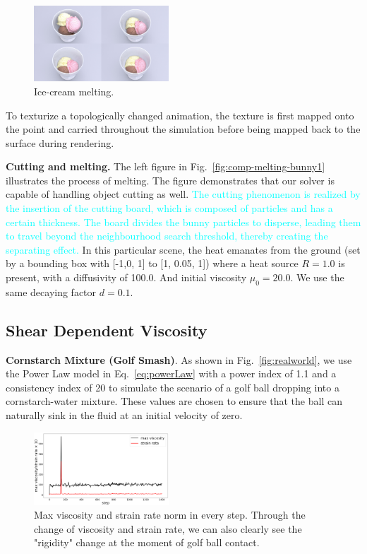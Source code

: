 \documentclass[10pt,journal,compsoc]{IEEEtran}
\newcommand{\revised}[1]{{\textcolor{cyan}{#1}}}
\begin{document}
\begin{figure}[htb]
	\centering
	\includegraphics[width=0.45\textwidth]{pics/ice-cream.png}
	\caption{Ice-cream melting. }     \label{fig:ice-cream}
\end{figure}

To texturize a topologically changed animation, the texture is first mapped onto the point and carried throughout the simulation before being mapped back to the surface during rendering.


\textbf{Cutting and melting.}
The left figure in Fig.~\ref{fig:comp-melting-bunny1} illustrates the process of melting. The figure demonstrates that our solver is capable of handling object cutting as well. \revised{The cutting phenomenon is realized by the insertion of the cutting board, which is composed of particles and has a certain thickness. The board divides the bunny particles to disperse, leading them to travel beyond the neighbourhood search threshold, thereby creating the separating effect.} In this particular scene, the heat emanates from the ground (set by a bounding box with [-1,0, 1] to [1, 0.05, 1]) where a heat source $R=1.0$ is present, with a diffusivity of 100.0. And initial viscosity $\mu_0=20.0$. We use the same decaying factor $d= 0.1$. 


\subsection{Shear Dependent Viscosity}
\textbf{Cornstarch Mixture (Golf Smash)}.
As shown in Fig.~\ref{fig:realworld}, we use the Power Law model in Eq.~\ref{eq:powerLaw} with a power index of 1.1 and a consistency index of 20 to simulate the scenario of a golf ball dropping into a cornstarch-water mixture. These values are chosen to ensure that the ball can naturally sink in the fluid at an initial velocity of zero.

\begin{figure}[htbp]
	\includegraphics[width=0.45\textwidth]{pics/maxviscoandstrainrate.png}
	\caption{Max viscosity and strain rate norm in every step. Through the change of viscosity and strain rate, we can also clearly see the "rigidity" change at the moment of golf ball contact.
	}     \label{fig:dropline}
\end{figure}
\end{document}

